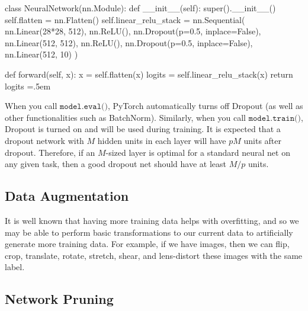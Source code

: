 \documentclass{article}
\newenvironment{cverbatim}
 {\SaveVerbatim{cverb}}
 {\endSaveVerbatim
  \flushleft\fboxrule=0pt\fboxsep=.5em
  \colorbox{cverbbg}{%
    \makebox[\dimexpr\linewidth-2\fboxsep][l]{\BUseVerbatim{cverb}}%
  }
  \endflushleft
}
\theoremstyle{definition}
\theoremstyle{remark}
\theoremstyle{definition}
\begin{document}
\begin{cverbatim}
class NeuralNetwork(nn.Module):
    def __init__(self):
        super().__init__()
        self.flatten = nn.Flatten()
        self.linear_relu_stack = nn.Sequential(
            nn.Linear(28*28, 512),
            nn.ReLU(),
            nn.Dropout(p=0.5, inplace=False), 
            nn.Linear(512, 512),
            nn.ReLU(),
            nn.Dropout(p=0.5, inplace=False), 
            nn.Linear(512, 10)
        )

    def forward(self, x):
        x = self.flatten(x)
        logits = self.linear_relu_stack(x)
        return logits
\end{cverbatim}

When you call $\texttt{model.eval()}$, PyTorch automatically turns off Dropout (as well as other functionalities such as BatchNorm). Similarly, when you call $\texttt{model.train()}$, Dropout is turned on and will be used during training. It is expected that a dropout network with $M$ hidden units in each layer will have $pM$ units after dropout. Therefore, if an $M$-sized layer is optimal for a standard neural net on any given task, then a good dropout net should have at least $M/p$ units. 


\subsection{Data Augmentation}

It is well known that having more training data helps with overfitting, and so we may be able to perform basic transformations to our current data to artificially generate more training data. For example, if we have images, then we can flip, crop, translate, rotate, stretch, shear, and lens-distort these images with the same label. 


\subsection{Network Pruning}
\end{document}
